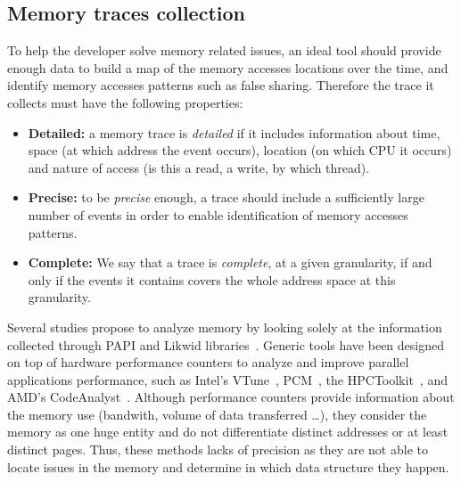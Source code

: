 \subsection{Memory traces collection}

To help the developer solve memory related issues, an ideal tool should provide enough data to build a map of the memory accesses locations over the time, and identify memory accesses patterns such as false sharing.
Therefore the trace it collects must have the following properties:
\label{def:traces}
\begin{itemize}
    \item  \textbf{Detailed:}  a memory trace is \emph{detailed} if it includes information about time, space (at which address the event occurs), location (on which CPU it occurs) and nature of access (is this a read, a write, by which thread).
    \item \textbf{Precise:} to be \emph{precise} enough, a trace should include a sufficiently large number of events in order to enable identification of memory accesses patterns.
    \item \textbf{Complete:} We say that a trace is \emph{complete}, at a given granularity, if and only if the events it contains covers the whole address space at this granularity.
\end{itemize}

Several studies propose to analyze memory  by looking solely at the information collected through \gls{PAPI} and \gls{Likwid} libraries~\cite{Majo13(Mis)understanding, Jiang14Understanding,Bosch00Rivet,Weyers14Visualization,Tao01Visualizing,DeRose01Hardware}.
Generic tools have been designed on top of hardware performance counters to analyze and improve parallel applications performance, such as Intel's \gls{VTune}~\cite{Reinders05VTune}, \gls{PCM}~\cite{Wilhalm12Intel}, the \gls{HPCToolkit}~\cite{Adhianto10HPCTOOLKIT}, and AMD's \gls{CodeAnalyst}~\cite{Drongowski08introduction}.
Although performance counters provide information about the memory use (bandwith, volume of data transferred \ldots),  they consider the memory as one huge entity and do not differentiate distinct addresses or at least distinct pages.
Thus, these methods lacks of precision as they are not able to locate issues in the memory and determine in which data structure they happen.

